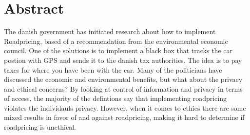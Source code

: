 \section*{Abstract}
The danish government has initiated research about how to implement Roadpricing, based of a recommendation from the environmental economic council. One of the solutions is to implement a black box that tracks the car postion with GPS and sends it to the danish tax authorities. The idea is to pay taxes for where you have been with the car. Many of the politicians have discussed the economic and environmental benefits, but what about the privacy and ethical concerns? By looking at control of information and privacy in terms of access, the majority of the defintions say that implementing roadpricing violates the individauls privacy. However, when it comes to ethics there are some mixed results in favor of and against roadpricing, making it hard to determine if roadpricing is unethical.